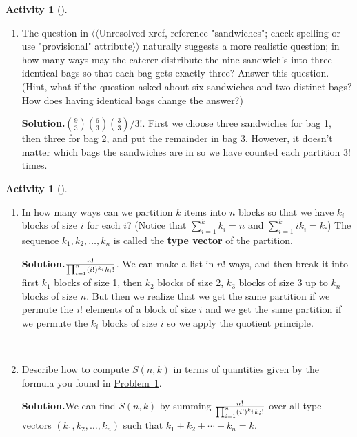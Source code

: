 \documentclass[10pt,]{book}
\newcommand{\terminology}[1]{\textbf{#1}}
\theoremstyle{plain}
\theoremstyle{definition}
\newtheorem{activity}[project]{Activity}
\numberwithin{equation}{chapter}
\begin{document}
\begin{activity}[]
\begin{enumerate}[label=(\alph*)]
~\par
\item The question in {$\langle\langle$Unresolved xref, reference "sandwiches"; check spelling or use "provisional" attribute$\rangle\rangle$} naturally suggests a more realistic question; in how many ways may the caterer distribute the nine sandwich's into three identical bags so that each bag gets exactly three? Answer this question. (Hint, what if the question asked about six sandwiches and two distinct bags? How does having identical bags change the answer?)%
\par\medskip\noindent%
\textbf{Solution.}\quad \({9\choose 3}{6\choose 3}{3\choose 3}/3!\). First we choose three sandwiches for bag 1, then three for bag 2, and put the remainder in bag 3. However, it doesn't matter which bags the sandwiches are in so we have counted each partition \(3!\) times.%

\end{enumerate}
\end{activity}
\begin{activity}[]\label{partitionsgivenpartsize}
~\par
\begin{enumerate}[label=(\alph*)]
 \item In how many ways can we partition \(k\) items into \(n\) blocks so that we have \(k_i\) blocks of size \(i\) for each \(i\)? (Notice that \(\sum_{i=1}^k k_i = n\) and \(\sum_{i=1}^k ik_i = k\).) The sequence \(k_1,k_2,\ldots,k_n\) is called the \terminology{type vector} of the partition.%
\par\medskip\noindent%
\textbf{Solution.}\quad \(n!\over \prod_{i=1}^n (i!)^{k_i}{k_i!}\). We can make a list in \(n!\) ways, and then break it into first \(k_1\) blocks of size 1, then \(k_2\) blocks of size 2, \(k_3\) blocks of size 3 up to \(k_n\) blocks of size \(n\). But then we realize that we get the same partition if we permute the \(i!\) elements of a block of size \(i\) and we get the same partition if we permute the \(k_i\) blocks of size \(i\) so we apply the quotient principle.%

~\par
\item Describe how to compute \(S(n,k)\) in terms of quantities given by the formula you found in \hyperref[partitionsgivenpartsize]{Problem~\ref{partitionsgivenpartsize}}.%
\par\medskip\noindent%
\textbf{Solution.}\quad We can find \(S(n,k)\) by summing \(n!\over \prod_{i=1}^n (i!)^{k_i}{k_i!}\) over all type vectors \((k_1,k_2,\ldots,k_n)\) such that \(k_1+k_2+\cdots+k_n=k\).%

\end{enumerate}
\end{activity}
\end{document}
